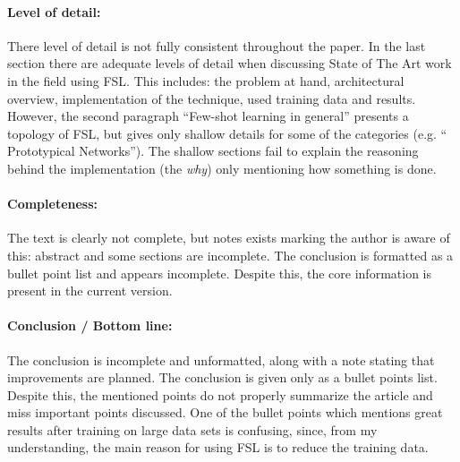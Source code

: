 \documentclass[12pt]{scrartcl}
\begin{document}


\paragraph{Level of detail:} There level of detail is not fully consistent
throughout the paper. In the last section there are adequate levels of detail
when discussing State of The Art work in the field using FSL. This includes:
the problem at hand, architectural overview, implementation of the technique,
used training data and results. However, the second paragraph ``Few-shot
learning in general'' presents a topology of FSL, but gives only shallow
details for some of the categories (e.g. `` Prototypical Networks''). The
shallow sections fail to explain the reasoning behind the implementation (the
\textit{why}) only mentioning how something is done.



\paragraph{Completeness:} The text is clearly not complete, but notes exists marking the author is aware of this: abstract and some sections are incomplete. The conclusion is formatted as a bullet point list and appears incomplete. Despite this, the core information is present in the current version.




\paragraph{Conclusion / Bottom line:} The conclusion is incomplete and
unformatted, along with a note stating that improvements are planned. The
conclusion is given only as a bullet points list. Despite this, the mentioned
points do not properly summarize the article and miss important points
discussed. One of the bullet points which mentions great results after training
on large data sets is confusing, since, from my understanding, the main reason
for using FSL is to reduce the training data.
\end{document}
